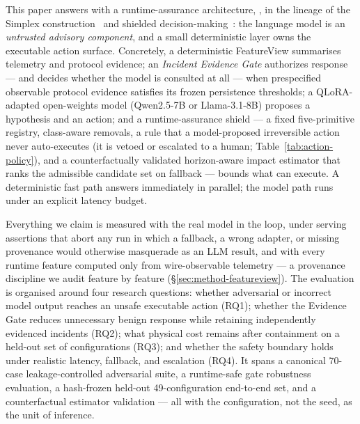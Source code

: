 This paper answers with a runtime-assurance architecture,
\ours{}, in the
lineage of the Simplex construction~\cite{Sha2001Simplex} and shielded
decision-making~\cite{Alshiekh2018Shielding}: the language model is an
\emph{untrusted advisory component}, and a small deterministic layer owns
the executable action surface. Concretely, a deterministic FeatureView
summarises telemetry and protocol evidence; an \emph{Incident Evidence
Gate} authorizes response --- and decides whether the model is consulted at
all --- when prespecified observable protocol evidence satisfies its frozen
persistence thresholds; a QLoRA-adapted
open-weights model (Qwen2.5-7B or Llama-3.1-8B) proposes a hypothesis and
an action; and a runtime-assurance shield --- a fixed five-primitive
registry, class-aware removals, a rule that a model-proposed irreversible
action never auto-executes (it is vetoed or escalated to a human;
Table~\ref{tab:action-policy}), and a counterfactually validated
horizon-aware impact estimator that ranks the admissible candidate set on
fallback ---
bounds what can execute. A deterministic fast path answers immediately in
parallel; the model path runs under an explicit latency budget.

Everything we claim is measured with the real model in the loop, under
serving assertions that abort any run in which a fallback, a wrong
adapter, or missing provenance would otherwise masquerade as an LLM
result, and with every runtime feature computed only from wire-observable
telemetry --- a provenance discipline we audit feature by feature
(\S\ref{sec:method-featureview}). The evaluation is
organised around four research questions: whether adversarial or incorrect
model output reaches an unsafe executable action (RQ1); whether the
Evidence Gate reduces unnecessary benign response while retaining
independently evidenced incidents (RQ2); what physical cost remains after
containment on a held-out set of configurations (RQ3); and whether
the safety boundary holds under realistic latency, fallback, and
escalation (RQ4). It spans a canonical 70-case leakage-controlled
adversarial suite, a runtime-safe gate robustness evaluation, a
hash-frozen held-out 49-configuration end-to-end set, and
a counterfactual estimator validation --- all with the configuration, not
the seed, as the unit of inference.

